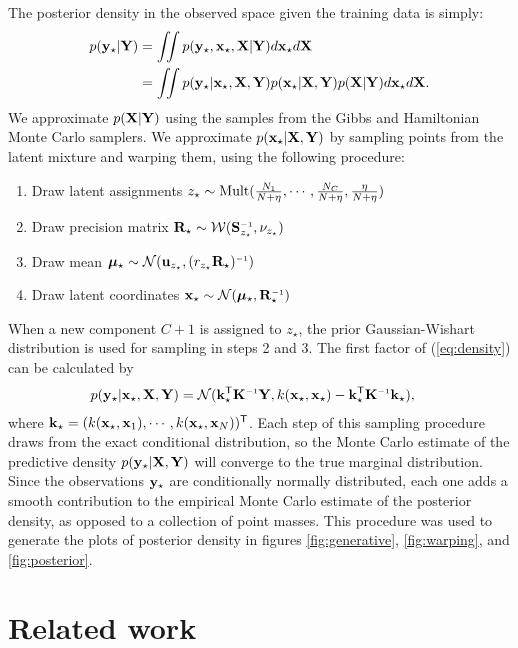 The posterior density in the observed space given the training data is simply:
\begin{align}
p({\bf{y}}_\star | \mathbf{Y})
& = \int \!\!\! \int p({\bf{y}}_\star,{\bf{x}}_\star, \mathbf{X} | \mathbf{Y})d{\bf{x}}_\star d\mathbf{X} \nonumber\\
& = \int\!\!\! \int p({\bf{y}}_\star | {\bf{x}}_\star, \mathbf{X}, \mathbf{Y})p({\bf{x}}_\star|\mathbf{X},\mathbf{Y})p(\mathbf{X}|\mathbf{Y})d{\bf{x}}_\star d\mathbf{X}.
\label{eq:density}
\end{align}
We approximate $p(\mathbf{X} | \mathbf{Y})$ using the samples from the Gibbs and Hamiltonian Monte Carlo samplers.
We approximate $p({\bf{x}}_\star | \mathbf{X}, \mathbf{Y})$ by sampling points from the latent mixture and warping them, using the following procedure:
\begin{enumerate}
\item Draw latent assignments
$z_\star \sim {\rm Mult}(\frac{N_{1}}{N+\eta},\cdots,\frac{N_{C}}{N+\eta},\frac{\eta}{N+\eta})$
\item Draw precision matrix
$\vR_\star \sim {\cal W}(\vS\inv_{z_\star},\nu_{z_\star})$
\item Draw mean
$\vmu_\star \sim {\cal N}(\vu_{z_\star},(r_{z_\star}\vR_\star)\inv)$
\item Draw latent coordinates
$\vx_\star \sim {\cal N}(\vmu_\star,\vR_\star\inv)$
\end{enumerate}
%
When a new component $C+1$ is assigned to $z_\star$, the prior Gaussian-Wishart distribution is used for sampling in steps 2 and 3.
The first factor of (\ref{eq:density}) can be calculated by
%
\begin{align}
p(\vy_\star | \vx_\star, \vX, \vY)
& = {\cal N}(\vk_\star\tra \vK\inv \vY, k(\vx_\star,\vx_\star)-\vk_\star\tra \vK\inv \vk_\star),
\end{align}
%
where
%
${\bf{k}}_\star=( k({\bf{x}}_\star, {\bf{x}}_1), \cdots, k({\bf{x}}_\star, {\bf{x}}_N))^{\mathsf{T}}$.
%  
Each step of this sampling procedure draws from the exact conditional distribution, so the Monte Carlo estimate of the predictive density $p({\bf{y}}_\star | \mathbf{X}, \mathbf{Y})$ will converge to the true marginal distribution.
Since the observations ${\bf{y}}_\star$ are conditionally normally distributed, each one adds a smooth contribution to the empirical Monte Carlo estimate of the posterior density, as opposed to a collection of point masses.
This procedure was used to generate the plots of posterior density in figures \ref{fig:generative}, \ref{fig:warping}, and \ref{fig:posterior}.





\section{Related work}

